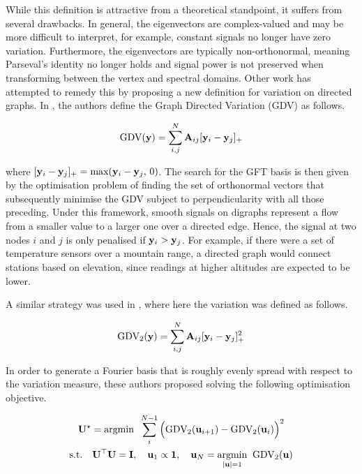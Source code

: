 While this definition is attractive from a theoretical standpoint, it suffers from several drawbacks. In general, the eigenvectors are complex-valued and may be more difficult to interpret, for example, constant signals no longer have zero variation. Furthermore, the eigenvectors are typically non-orthonormal, meaning Parseval's identity no longer holds and  signal power is not preserved when transforming between the vertex and spectral domains. Other work has attempted to remedy this by proposing a new definition for variation on directed graphs. In \cite{Sardellitti2017}, the authors define the Graph Directed Variation (GDV) as follows. 

\begin{equation}
    \text{GDV}(\mathbf{y}) = \sum_{i,j}^N \mathbf{A}_{ij} [\mathbf{y}_i - \mathbf{y}_j]_{+}
\end{equation}

where $[\mathbf{y}_i - \mathbf{y}_j]_{+} = \text{max}(\mathbf{y}_i - \mathbf{y}_j, \, 0)$. The search for the GFT basis is then given by the optimisation problem of finding the set of orthonormal vectors that subsequently minimise the GDV subject to perpendicularity with all those preceding. Under this framework, smooth signals on digraphs represent a flow from a smaller value to a larger one over a directed edge. Hence, the signal at two nodes $i$ and $j$ is only penalised if $\mathbf{y}_i > \mathbf{y}_j$. For example, if there were a set of temperature sensors over a mountain range, a directed graph would connect stations based on elevation, since readings at higher altitudes are expected to be lower. 

A similar strategy was used in \cite{Shafipour2019}, where here the variation was defined as follows.  

\begin{equation}
    \text{GDV}_2(\mathbf{y}) = \sum_{i,j}^N \mathbf{A}_{ij} [\mathbf{y}_i - \mathbf{y}_j]_{+}^2
\end{equation}

In order to generate a Fourier basis that is roughly evenly spread with respect to the variation measure, these authors proposed solving the following optimisation objective. 

\begin{equation}
    \begin{gathered}
    \mathbf{U}^{\star} = \text{argmin} \;\; \sum_{i}^{N-1} \Big(\text{GDV}_2(\mathbf{u}_{i+1}) - \text{GDV}_2(\mathbf{u}_i)\Big)^2 \\
    \text{s.t.} \quad \mathbf{U}^\top\mathbf{U} = \mathbf{I}, \quad \mathbf{u}_1 \propto \mathbf{1}, \quad \mathbf{u}_N = \underset{|\mathbf{u}| = 1}{\text{argmin} } \;\; \text{GDV}_2(\mathbf{u})
    \end{gathered}
\end{equation}

